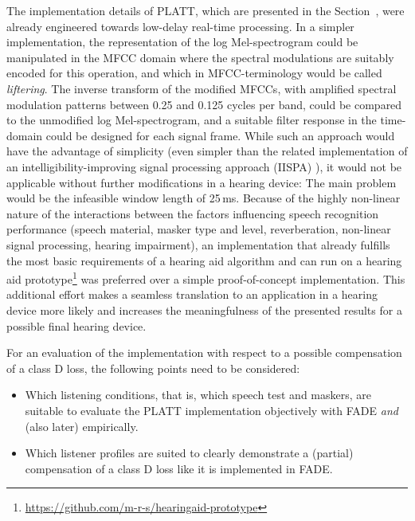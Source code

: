 \documentclass[10pt,a4paper,twocolumn]{article}
\begin{document}
The implementation details of PLATT, which are presented in the Section~, were already engineered towards low-delay real-time processing.
%
In a simpler implementation, the representation of the log Mel-spectrogram could be manipulated in the MFCC domain where the spectral modulations are suitably encoded for this operation, and which in MFCC-terminology would be called \emph{liftering}.
%
The inverse transform of the modified MFCCs, with amplified spectral modulation patterns between 0.25 and 0.125 cycles per band, could be compared to the unmodified log Mel-spectrogram, and a suitable filter response in the time-domain could be designed for each signal frame.
%
While such an approach would have the advantage of simplicity (even simpler than the related implementation of an intelligibility-improving signal processing approach (IISPA) \cite{schaedler2020b}), it would not be applicable without further modifications in a hearing device: The main problem would be the infeasible window length of 25\,ms.
%
Because of the highly non-linear nature of the interactions between the factors influencing speech recognition performance (speech material, masker type and level, reverberation, non-linear signal processing, hearing impairment), an implementation that already fulfills the most basic requirements of a hearing aid algorithm and can run on a hearing aid prototype\footnote{\url{https://github.com/m-r-s/hearingaid-prototype}} was preferred over a simple proof-of-concept implementation.
%
This additional effort makes a seamless translation to an application in a hearing device more likely and increases the meaningfulness of the presented results for a possible final hearing device.
	
For an evaluation of the implementation with respect to a possible compensation of a class D loss, the following points need to be considered:
\begin{itemize}
  \item[1)] Which listening conditions, that is, which speech test and maskers, are suitable to evaluate the PLATT implementation objectively with FADE \emph{and} (also later) empirically.
  \item[2)] Which listener profiles are suited to clearly demonstrate a (partial) compensation of a class D loss like it is implemented in FADE.
\end{itemize}
\end{document}
